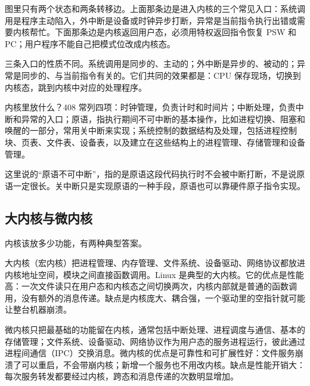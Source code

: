 图里只有两个状态和两条转移边。上面那条边是进入内核的三个常见入口：系统调用是程序主动陷入，外中断是设备或时钟异步打断，异常是当前指令执行出错或需要内核帮忙。下面那条边是内核返回用户态，必须用特权返回指令恢复 PSW 和 PC；用户程序不能自己把模式位改成内核态。

三条入口的性质不同。系统调用是同步的、主动的；外中断是异步的、被动的；异常是同步的、与当前指令有关的。它们共同的效果都是：CPU 保存现场，切换到内核态，跳到内核中对应的处理程序。

内核里放什么？408 常列四项：时钟管理，负责计时和时间片；中断处理，负责中断和异常的入口；原语，指执行期间不可中断的基本操作，比如进程切换、阻塞和唤醒的一部分，常用关中断来实现；系统控制的数据结构及处理，包括进程控制块、页表、文件表、设备表，以及建立在这些结构上的进程管理、存储管理和设备管理。

这里说的“原语不可中断”，指的是原语这段代码执行时不会被中断打断，不是说原语一定很长。关中断只是实现原语的一种手段，原语也可以靠硬件原子指令实现。

\subsection{大内核与微内核}

内核该放多少功能，有两种典型答案。

大内核（宏内核）把进程管理、内存管理、文件系统、设备驱动、网络协议都放进内核地址空间，模块之间直接函数调用。Linux 是典型的大内核。它的优点是性能高：一次文件读只在用户态和内核态之间切换两次，内核内部就是普通的函数调用，没有额外的消息传递。缺点是内核庞大、耦合强，一个驱动里的空指针就可能让整台机器崩溃。

微内核只把最基础的功能留在内核，通常包括中断处理、进程调度与通信、基本的存储管理；文件系统、设备驱动、网络协议作为用户态的服务进程运行，彼此通过进程间通信（IPC）交换消息。微内核的优点是可靠性和可扩展性好：文件服务崩溃了可以重启，不会带崩内核；新增一个服务也不用改内核。缺点是性能开销大：每次服务转发都要经过内核，跨态和消息传递的次数明显增加。

